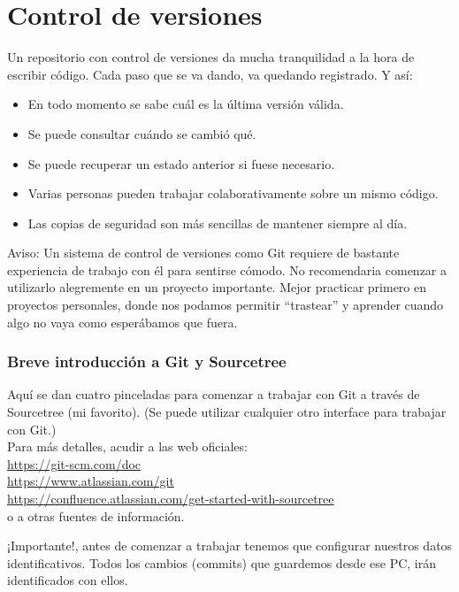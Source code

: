 \documentclass[spanish,12pt,a4paper,final,oneside]{book}
\begin{document}
\section{Control de versiones}
Un repositorio con control de versiones da mucha tranquilidad a la hora de escribir código. Cada paso que se va dando, va quedando registrado. Y así:
\begin{itemize}
\item En todo momento se sabe cuál es la última versión válida.
\item Se puede consultar cuándo se cambió qué.
\item Se puede recuperar un estado anterior si fuese necesario.
\item Varias personas pueden trabajar colaborativamente sobre un mismo código. 
\item Las copias de seguridad son más sencillas de mantener siempre al día.
\end{itemize}

Aviso: Un sistema de control de versiones como Git requiere de bastante experiencia de trabajo con él para sentirse cómodo. No recomendaria comenzar a utilizarlo alegremente en un proyecto importante. Mejor practicar primero en proyectos personales, donde nos podamos permitir ``trastear'' y aprender cuando algo no vaya como esperábamos que fuera.

\subsubsection{Breve introducción a Git y Sourcetree}
Aquí se dan cuatro pinceladas para comenzar a trabajar con Git a través de Sourcetree (mi favorito). (Se puede utilizar cualquier otro interface para trabajar con Git.)
\\Para más detalles, acudir a las web oficiales:
\\ \url{https://git-scm.com/doc}
\\ \url{https://www.atlassian.com/git}
\\ \url{https://confluence.atlassian.com/get-started-with-sourcetree}
\\o a otras fuentes de información.

¡Importante!, antes de comenzar a trabajar tenemos que configurar nuestros datos identificativos. Todos los cambios (commits) que guardemos desde ese PC, irán identificados con ellos.
\end{document}
